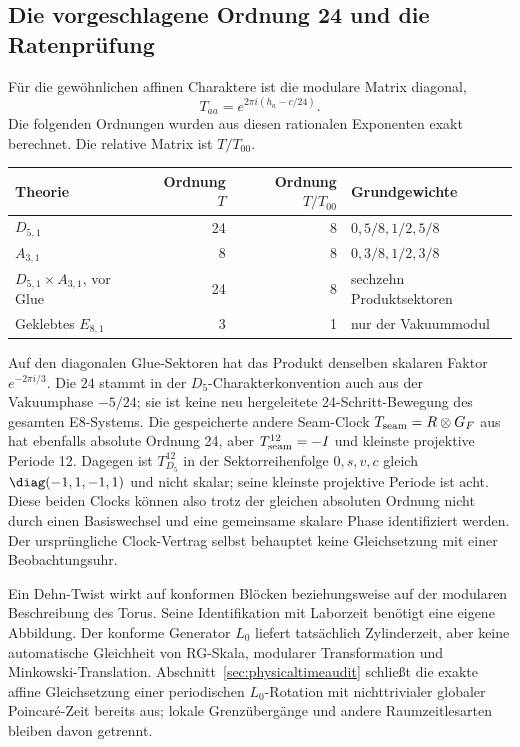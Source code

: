 \subsection*{Die vorgeschlagene Ordnung 24 und die Ratenprüfung}
Für die gewöhnlichen affinen Charaktere ist die modulare Matrix diagonal,
\[
 T_{aa}=e^{2\pi i(h_a-c/24)}.
\]
Die folgenden Ordnungen wurden aus diesen rationalen Exponenten exakt berechnet. Die relative Matrix ist $T/T_{00}$.
\begin{center}
\begin{tabular}{lrrl}
\toprule
Theorie & Ordnung $T$ & Ordnung $T/T_{00}$ & Grundgewichte\\\midrule
$D_{5,1}$ & 24 & 8 & $0,5/8,1/2,5/8$\\
$A_{3,1}$ & 8 & 8 & $0,3/8,1/2,3/8$\\
$D_{5,1}\times A_{3,1}$, vor Glue & 24 & 8 & sechzehn Produktsektoren\\
Geklebtes $E_{8,1}$ & 3 & 1 & nur der Vakuummodul\\\bottomrule
\end{tabular}
\end{center}
Auf den diagonalen Glue-Sektoren hat das Produkt denselben skalaren Faktor $e^{-2\pi i/3}$. Die $24$ stammt in der $D_5$-Charakterkonvention auch aus der Vakuumphase $-5/24$; sie ist keine neu hergeleitete 24-Schritt-Bewegung des gesamten E8-Systems. Die gespeicherte andere Seam-Clock $T_{\rm seam}=R\otimes G_F$ aus  hat ebenfalls absolute Ordnung 24, aber $T_{\rm seam}^{12}=-I$ und kleinste projektive Periode 12. Dagegen ist $T_{D_5}^{12}$ in der Sektorreihenfolge $0,s,v,c$ gleich $\diag(-1,1,-1,1)$ und nicht skalar; seine kleinste projektive Periode ist acht. Diese beiden Clocks können also trotz der gleichen absoluten Ordnung nicht durch einen Basiswechsel und eine gemeinsame skalare Phase identifiziert werden. Der ursprüngliche Clock-Vertrag selbst behauptet keine Gleichsetzung mit einer Beobachtungsuhr.

Ein Dehn-Twist wirkt auf konformen Blöcken beziehungsweise auf der modularen Beschreibung des Torus. Seine Identifikation mit Laborzeit benötigt eine eigene Abbildung. Der konforme Generator $L_0$ liefert tatsächlich Zylinderzeit, aber keine automatische Gleichheit von RG-Skala, modularer Transformation und Minkowski-Translation. Abschnitt~\ref{sec:physicaltimeaudit} schließt die exakte affine Gleichsetzung einer periodischen $L_0$-Rotation mit nichttrivialer globaler Poincar\'e-Zeit bereits aus; lokale Grenzübergänge und andere Raumzeitlesarten bleiben davon getrennt.

